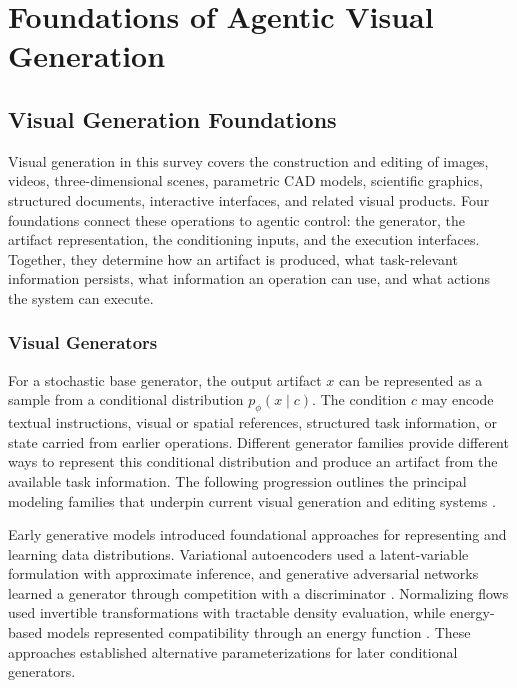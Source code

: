 \section{Foundations of Agentic Visual Generation}
\label{sec:foundations}

\subsection{Visual Generation Foundations}
\label{sec:visual-foundations}

Visual generation in this survey covers the construction and editing of images, videos, three-dimensional scenes, parametric CAD models, scientific graphics, structured documents, interactive interfaces, and related visual products. Four foundations connect these operations to agentic control: the generator, the artifact representation, the conditioning inputs, and the execution interfaces. Together, they determine how an artifact is produced, what task-relevant information persists, what information an operation can use, and what actions the system can execute.

\subsubsection{Visual Generators}

For a stochastic base generator, the output artifact $x$ can be represented as a sample from a conditional distribution $p_{\phi}(x \mid c)$. The condition $c$ may encode textual instructions, visual or spatial references, structured task information, or state carried from earlier operations. Different generator families provide different ways to represent this conditional distribution and produce an artifact from the available task information. The following progression outlines the principal modeling families that underpin current visual generation and editing systems \cite{he2024llms,yang2025textimage,wang2025imageediting,yin2025spatiotemporal,wu2026visualgeneration}.

Early generative models introduced foundational approaches for representing and learning data distributions. Variational autoencoders used a latent-variable formulation with approximate inference, and generative adversarial networks learned a generator through competition with a discriminator \cite{kingma2013autoencoding,goodfellow2014gan}. Normalizing flows used invertible transformations with tractable density evaluation, while energy-based models represented compatibility through an energy function \cite{he2024llms,yang2025textimage}. These approaches established alternative parameterizations for later conditional generators.

